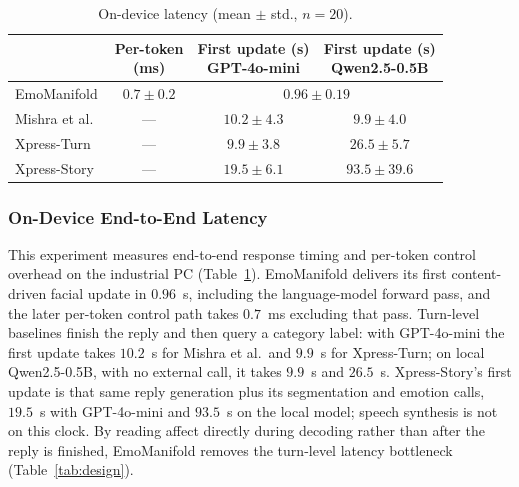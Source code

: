 \documentclass[letterpaper, 10 pt, conference]{ieeeconf}
\begin{document}
\begin{table}[t]
    \caption{On-device latency (mean $\pm$ std., $n{=}20$).}
    \label{tab:latency}
    \centering
    \begin{tabular}{@{}lccc@{}}
    \toprule
    \raisebox{3pt}{System} & \shortstack{Per-token\\(ms)} & \shortstack{First update (s)\\GPT-4o-mini} & \shortstack{First update (s)\\Qwen2.5-0.5B} \\
    \midrule
    EmoManifold & $0.7{\pm}0.2$ & \multicolumn{2}{c}{$0.96{\pm}0.19$} \\
    Mishra et al.~\cite{mishra2023realtime} & --- & $10.2{\pm}4.3$ & $9.9{\pm}4.0$ \\
    Xpress-Turn~\cite{antony2025xpress} & --- & $9.9{\pm}3.8$ & $26.5{\pm}5.7$ \\
    Xpress-Story~\cite{antony2025xpress} & --- & $19.5{\pm}6.1$ & $93.5{\pm}39.6$ \\
    \bottomrule
    \end{tabular}
\end{table}


\subsubsection{On-Device End-to-End Latency}
This experiment measures end-to-end response timing and per-token control overhead on the industrial PC (Table~\ref{tab:latency}). EmoManifold delivers its first content-driven facial update in $0.96$~s, including the language-model forward pass, and the later per-token control path takes $0.7$~ms excluding that pass. Turn-level baselines finish the reply and then query a category label: with GPT-4o-mini the first update takes $10.2$~s for Mishra et al.\ and $9.9$~s for Xpress-Turn; on local Qwen2.5-0.5B, with no external call, it takes $9.9$~s and $26.5$~s. Xpress-Story's first update is that same reply generation plus its segmentation and emotion calls, $19.5$~s with GPT-4o-mini and $93.5$~s on the local model; speech synthesis is not on this clock. By reading affect directly during decoding rather than after the reply is finished, EmoManifold removes the turn-level latency bottleneck (Table~\ref{tab:design}).
\end{document}

